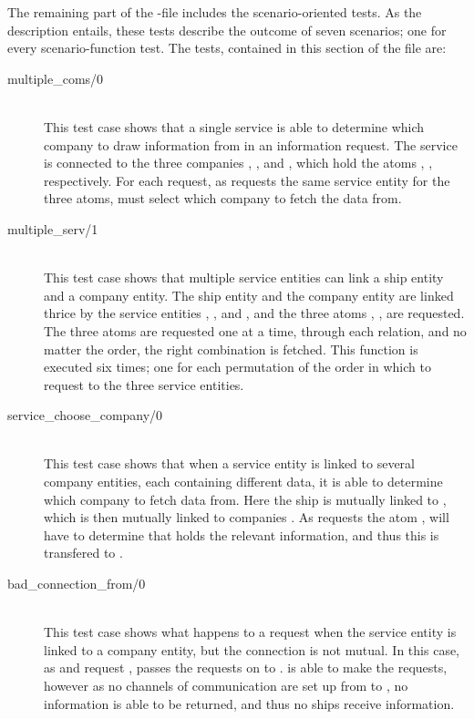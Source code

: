 The remaining part of the -file includes the scenario-oriented tests. As the description entails, these tests describe the outcome of seven scenarios; one for every scenario-function test. The tests, contained in this section of the file are:

\begin{description}
  \item[{multiple\_coms/0}]\ \\
    This test case shows that a single service is able to determine which company to draw information from in an information request. The service  is connected to the three companies , , and , which hold the atoms , ,  respectively. For each request, as  requests the same service entity  for the three atoms,  must select which company to fetch the data from.
  \item[{multiple\_serv/1}]\ \\
    This test case shows that multiple service entities can link a ship entity and a company entity. The ship entity  and the company entity  are linked thrice by the service entities , , and , and the three atoms , ,  are requested. The three atoms are requested one at a time, through each relation, and no matter the order, the right combination is fetched. This function is executed six times; one for each permutation of the order in which to request to the three service entities.
  \item[{service\_choose\_company/0}]\ \\
    This test case shows that when a service entity is linked to several company entities, each containing different data, it is able to determine which company to fetch data from. Here the ship  is mutually linked to , which is then mutually linked to companies \ttt{Com[1..5}. As  requests the atom ,  will have to determine that  holds the relevant information, and thus this is transfered to .
  \item[{bad\_connection\_from/0}]\ \\
    This test case shows what happens to a request when the service entity is linked to a company entity, but the connection is not mutual. In this case, as  and  request ,  passes the requests on to .  is able to make the requests, however as no channels of communication are set up from  to , no information is able to be returned, and thus no ships receive information.

\end{description}
